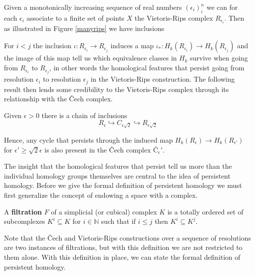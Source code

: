 Given a monotonically increasing sequence of real numbers $(\epsilon_{i})^{n}_{i}$ we can for each $\epsilon_{i}$ associate to a finite set of points $X$ the Vietoris-Rips complex $R_{\epsilon_{i}}$. Then as illustrated in Figure \ref{manyrips} we have inclusions
\begin{center}
\end{center}
For $i<j$ the inclusion $\iota: R_{\epsilon_i} \to R_{\epsilon_{j}}$ induces a map $\iota_{*}: H_{k}(R_{\epsilon_{i}}) \to H_{k}(R_{\epsilon_j})$ and the image of this map tell us which equivalence classes in $H_{k}$ survive when going from $R_{\epsilon_{i}}$ to $R_{\epsilon_{j}}$, in other words the homological features that persist going from resolution $\epsilon_{i}$ to resolution $\epsilon_{j}$ in the Vietoris-Rips construction. The following result then lends some credibility to the Vietoris-Rips complex through its relationship with the Čech complex.
\begin{lemma}
  Given $\epsilon > 0$ there is a chain of inclusions
  \[R_{\epsilon} \hookrightarrow C_{\epsilon \sqrt{2}} \hookrightarrow R_{\epsilon \sqrt{2}}\]
\end{lemma}
Hence, any cycle that persists through the induced map $H_{k}(R_{\epsilon}) \to H_{k}(R_{\epsilon'})$ for $\epsilon'  \geq \sqrt{2} \epsilon$ is also present in the Čech complex $\text{Č}_{\epsilon}'$.

The insight that the homological features that persist tell us more than the individual homology groups themselves are central to the idea of persistent homology. Before we give the formal definition of persistent homology we must first generalize the concept of endowing a space with a complex.

\begin{definition}
A \textbf{filtration} $F$ of a simplicial (or cubical) complex $K$ is a totally ordered set of subcomplexes $K^{i}  \subseteq K$ for $i \in \mathbb{N}$ such that if $i \leq j$ then $K^{i} \subseteq K^{j}$.
\end{definition}

Note that the Čech and Vietoris-Rips constructions over a sequence of resolutions are two instances of filtrations, but with this definition we are not restricted to them alone. With this definition in place, we can state the formal definition of persistent homology.

